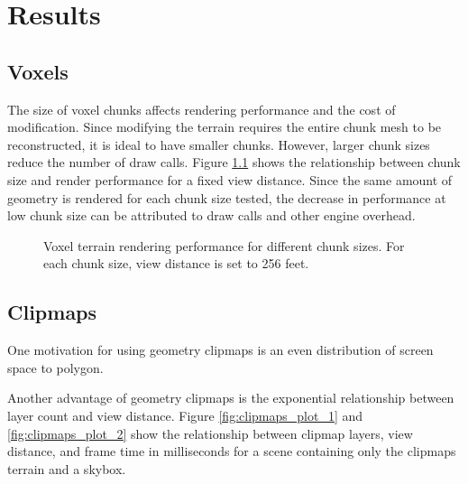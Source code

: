 
\iffalse  \fi

\chapter{Results}


\section{Voxels}

The size of voxel chunks affects rendering performance and the cost of modification.
Since modifying the terrain requires the entire chunk mesh to be reconstructed, it is ideal to have smaller chunks.
However, larger chunk sizes reduce the number of draw calls.
Figure \ref{fig:voxel_plot_1} shows the relationship between chunk size and render performance for a fixed view distance.
Since the same amount of geometry is rendered for each chunk size tested, the decrease in performance at low chunk size can be attributed to draw calls and other engine overhead.

\begin{figure}
	\centering
{}
	\caption{
		Voxel terrain rendering performance for different chunk sizes.
		For each chunk size, view distance is set to 256 feet.
	}
	\label{fig:voxel_plot_1}
\end{figure}


\section{Clipmaps}

One motivation for using geometry clipmaps is an even distribution of screen space to polygon.

Another advantage of geometry clipmaps is the exponential relationship between layer count and view distance.
Figure \ref{fig:clipmaps_plot_1} and \ref{fig:clipmaps_plot_2} show the relationship between clipmap layers, view distance, and frame time in milliseconds for a scene containing only the clipmaps terrain and a skybox.

